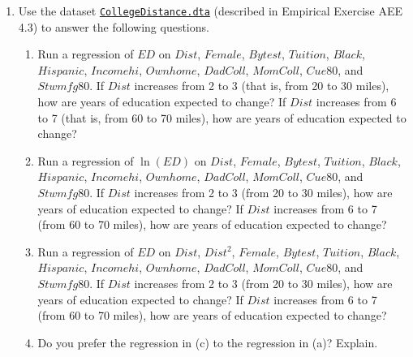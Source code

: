\documentclass[11pt]{article}
\begin{document}
\begin{enumerate}
\item
  Use the dataset
  \href{https://www.princeton.edu/~mwatson/Stock-Watson_3u/Students/EE_Datasets/CollegeDistance.dta}{\texttt{CollegeDistance.dta}}
  (described in Empirical Exercise AEE 4.3) to answer the following questions.

\begin{enumerate}
\def\labelenumi{\alph{enumi}.}

\item
  Run a regression of \(ED\) on \(Dist\), \(Female\), \(Bytest\), \(Tuition\), \(Black\), \(Hispanic\), \(Incomehi\), \(Ownhome\), \(DadColl\), \(MomColl\), \(Cue80\), and \(Stwmfg80\). If \(Dist\) increases from 2 to 3 (that is, from 20 to 30 miles), how are years of education expected to change? If \(Dist\) increases from 6 to 7 (that is, from 60 to 70 miles), how are years of education expected to change?

\item
  Run a regression of \(\ln(ED)\) on \(Dist\), \(Female\), \(Bytest\), \(Tuition\), \(Black\), \(Hispanic\), \(Incomehi\), \(Ownhome\), \(DadColl\), \(MomColl\), \(Cue80\), and \(Stwmfg80\). If \(Dist\) increases from 2 to 3 (from 20 to 30 miles), how are years of education expected to change? If \(Dist\) increases from 6 to 7 (from 60 to 70 miles), how are years of education expected to change?

\item
  Run a regression of \(ED\) on \(Dist\), \(Dist^2\), \(Female\), \(Bytest\), \(Tuition\), \(Black\), \(Hispanic\), \(Incomehi\), \(Ownhome\), \(DadColl\), \(MomColl\), \(Cue80\), and \(Stwmfg80\). If \(Dist\) increases from 2 to 3 (from 20 to 30 miles), how are years of education expected to change? If \(Dist\) increases from 6 to 7 (from 60 to 70 miles), how are years of education expected to change?

\item
  Do you prefer the regression in (c) to the regression in (a)? Explain.



\end{enumerate}
\end{enumerate}
\end{document}
